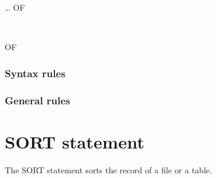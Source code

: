 \begin{syntax}
      
\end{syntax}

\begin{syntax}[\miscextcolour]
\end{syntax}

\begin{syntax}[\miscextcolour]
  \begin{1=}
    \identifier
  \end{1=}\ldots
    OF
  \begin{1=}
     \\
  \end{1=}
  OF \filename
\end{syntax}

\subsubsection{Syntax rules}

\subsubsection{General rules}

\section{SORT statement}

The SORT statement sorts the record of a file or a table.

